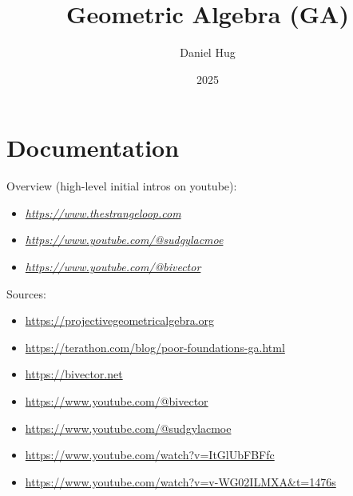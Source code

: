 \documentclass[12pt,oneside,a4paper]{article}
\title{Geometric Algebra (GA)}
\author{Daniel Hug}
\date{2025}
\begin{document}
\maketitle

\setlength{\parindent}{0pt}

\section{Documentation}

Overview (high-level initial intros on youtube):
\scriptsize
\begin{itemize}
    \item \href{https://www.youtube.com/watch?v=1cRFfYQYGxE&list=PLcGKfGEEONaBNsY_bOj8IhbCPvj6OAdWo&index=33}{\textit{https://www.thestrangeloop.com}}
    \item \href{https://www.youtube.com/watch?v=60z_hpEAtD8&t=17s}{\textit{https://www.youtube.com/@sudgylacmoe}}
    \item \href{https://www.youtube.com/watch?v=zgi-13F2Kec&list=PLsSPBzvBkYjxV8QMlOTYgrqa-nmlt_L7A&index=11}{\textit{https://www.youtube.com/@bivector}}
\end{itemize}

\normalsize

Sources:
\scriptsize
\begin{itemize}
    \item \url{https://projectivegeometricalgebra.org}
    \item \url{https://terathon.com/blog/poor-foundations-ga.html}
    \item \url{https://bivector.net}
    \item \url{https://www.youtube.com/@bivector}
    \item \url{https://www.youtube.com/@sudgylacmoe}
    \item \url{https://www.youtube.com/watch?v=ItGlUbFBFfc}
    \item \url{https://www.youtube.com/watch?v=v-WG02ILMXA&t=1476s}
\end{itemize}
\normalsize


\newpage





\end{document}
